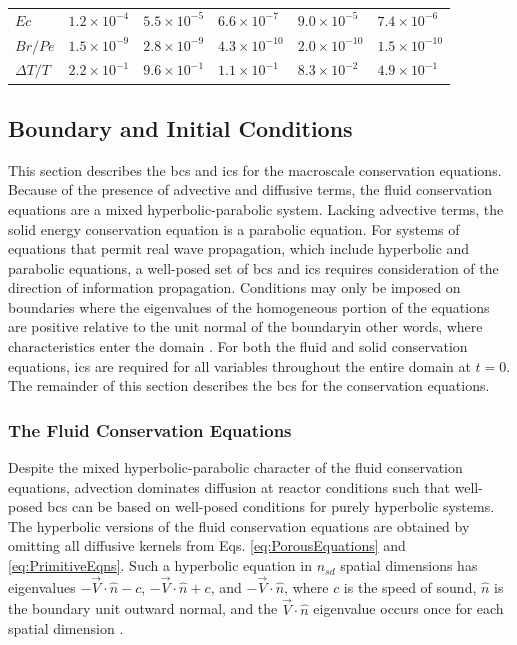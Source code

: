\begin{table}[!h]
\begin{tabular}{|l |l l l l l|}
 \(Ec\) & \(1.2\times10^{-4}\) & \(5.5\times10^{-5}\) & \(6.6\times10^{-7}\) & \(9.0\times10^{-5}\) & \(7.4\times10^{-6}\)\\
 \(Br/Pe\)							& \(1.5\times10^{-9}\)& \(2.8\times10^{-9}\)	& \(4.3\times10^{-10}\)	& \(2.0\times10^{-10}\)	& \(1.5\times10^{-10}\)\\
 \(\Delta T/T\) & \(2.2\times10^{-1}\) & \(9.6\times10^{-1}\) & \(1.1\times10^{-1}\) & \(8.3\times10^{-2}\) & \(4.9\times10^{-1}\)\Bstrut\\
\hline
\end{tabular}
\label{table:TypicalData}
\end{table}

\subsection{Boundary and Initial Conditions}
\label{sec:BCs}

This section describes the \glspl{bc} and \glspl{ic} for the macroscale conservation equations. Because of the presence of advective and diffusive terms, the fluid conservation equations are a mixed hyperbolic-parabolic system. Lacking advective terms, the solid energy conservation equation is a parabolic equation. For systems of equations that permit real wave propagation, which include hyperbolic and parabolic equations, a well-posed set of \glspl{bc} and \glspl{ic} requires consideration of the direction of information propagation. Conditions may only be imposed on boundaries where the eigenvalues of the homogeneous portion of the equations are positive relative to the unit normal of the boundary\mdash  in other words, where characteristics enter the domain \cite{hirsch}. For both the fluid and solid conservation equations, \glspl{ic} are required for all variables throughout the entire domain at \(t=0\). The remainder of this section describes the \glspl{bc} for the conservation equations.

\subsubsection{The Fluid Conservation Equations}

Despite the mixed hyperbolic-parabolic character of the fluid conservation equations, advection dominates diffusion at reactor conditions such that well-posed \glspl{bc} can be based on well-posed conditions for purely hyperbolic systems. The hyperbolic versions of the fluid conservation equations are obtained by omitting all diffusive kernels from Eqs. \eqref{eq:PorousEquations} and \eqref{eq:PrimitiveEqns}. Such a hyperbolic equation in \(n_{sd}\) spatial dimensions has eigenvalues \(-\vec{V}\cdot\hat{n}-c\), \(-\vec{V}\cdot\hat{n}+c\), and \(-\vec{V}\cdot\hat{n}\), where \(c\) is the speed of sound, \(\hat{n}\) is the boundary unit outward normal, and the \(\vec{V}\cdot\hat{n}\) eigenvalue occurs once for each spatial dimension \cite{rohde}. 

